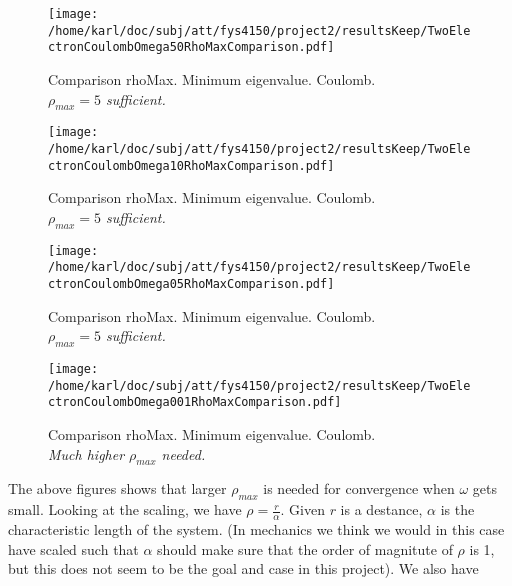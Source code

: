 \documentclass{article}
\begin{document}
\begin{minipage}{.49\textwidth} %
	\begin{figure}[H]
		\centering
		\texttt{[image: /home/karl/doc/subj/att/fys4150/project2/resultsKeep/TwoElectronCoulombOmega50RhoMaxComparison.pdf]}
		\caption{Comparison rhoMax. Minimum eigenvalue. Coulomb. \\
			\textit{$\rho_{max} = 5$ sufficient.}}
		\label{1}
	\end{figure}
\end{minipage}\hfill
\begin{minipage}{.49\textwidth}
	\begin{figure}[H]
		\centering
		\texttt{[image: /home/karl/doc/subj/att/fys4150/project2/resultsKeep/TwoElectronCoulombOmega10RhoMaxComparison.pdf]}
		\caption{Comparison rhoMax. Minimum eigenvalue. Coulomb. \\
			\textit{$\rho_{max} = 5$ sufficient.}}
		\label{1}
	\end{figure}
\end{minipage}\hfill
\begin{minipage}{.49\textwidth}
	\begin{figure}[H]
		\centering
		\texttt{[image: /home/karl/doc/subj/att/fys4150/project2/resultsKeep/TwoElectronCoulombOmega05RhoMaxComparison.pdf]}
		\caption{Comparison rhoMax. Minimum eigenvalue. Coulomb. \\
		\textit{$\rho_{max} = 5$ sufficient.}}
		\label{1}
	\end{figure}
\end{minipage}\hfill
\vspace{2ex}
\begin{minipage}{.49\textwidth}
	\begin{figure}[H]
		\centering
		\texttt{[image: /home/karl/doc/subj/att/fys4150/project2/resultsKeep/TwoElectronCoulombOmega001RhoMaxComparison.pdf]}
		\caption{Comparison rhoMax. Minimum eigenvalue. Coulomb. \\
			\textit{Much higher $\rho_{max}$ needed.}}
		\label{1}
	\end{figure}
\end{minipage}\hfill
\vspace{2ex}

The above figures shows that larger $\rho_{max}$ is needed for convergence when $\omega$ gets small. Looking at the scaling, we have $\rho = \frac{r}{\alpha}$. Given $r$ is a destance, $\alpha$ is the characteristic length of the system. (In mechanics we think we would in this case have scaled such that $\alpha$ should make sure that the order of magnitute of $\rho$ is 1, but this does not seem to be the goal and case in this project). We also have 
\end{document}

